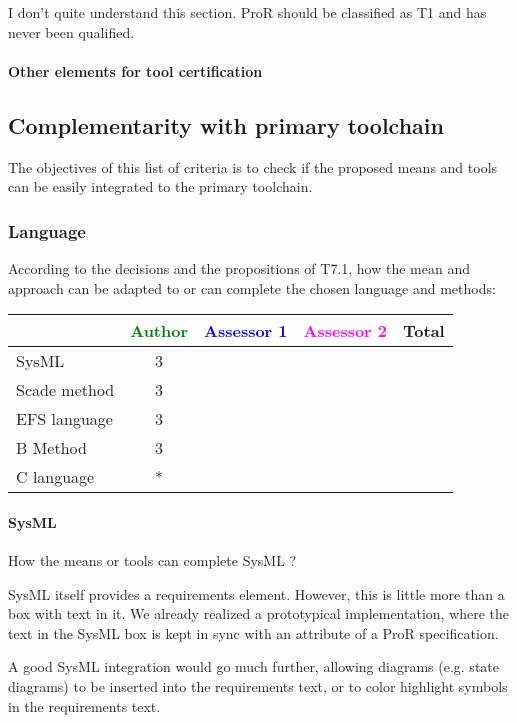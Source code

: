 \begin{author_comment}
I don't quite understand this section.  ProR should be classified as T1 and has never been qualified.

\end{author_comment}

\paragraph{Other elements for tool certification}


\subsection{Complementarity with primary toolchain}

The objectives of this list of criteria is to check if the proposed means and tools can be easily integrated to the primary toolchain.

\subsubsection{Language}


According to the decisions and the propositions of T7.1, how the mean and approach can be adapted to or can complete the chosen language and methods:

\begin{tabular}{|l | c | c | c | c|}
\hline
& \textcolor{green}{Author} & \textcolor{blue}{Assessor 1} & \textcolor{magenta}{Assessor 2} & Total \\
\hline 
SysML  & 3 & & & \\
\hline
Scade method & 3 & & & \\
\hline
EFS language & 3 & & & \\
\hline
B Method & 3 & & & \\
\hline
C language & * & & & \\
\hline
\end{tabular}

\paragraph{SysML}
How the means or tools can complete SysML ?

\begin{author_comment}
SysML itself provides a requirements element.  However, this is little more than a box with text in it.  We already realized a prototypical implementation, where the text in the SysML box is kept in sync with an attribute of a ProR specification.

A good SysML integration would go much further, allowing diagrams (e.g. state diagrams) to be inserted into the requirements text, or to color highlight symbols in the requirements text.
\end{author_comment}

